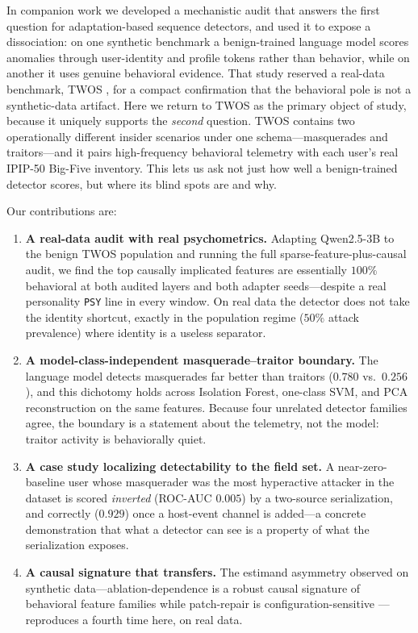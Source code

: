 \documentclass[10pt]{article}
\begin{document}
In companion work we developed a mechanistic audit that answers the first
question for adaptation-based sequence detectors, and used it to expose a
dissociation: on one synthetic benchmark a benign-trained language model scores
anomalies through user-identity and profile tokens rather than behavior, while
on another it uses genuine behavioral evidence. That study reserved a real-data
benchmark, TWOS \citep{harilal2017twos}, for a compact confirmation that the
behavioral pole is not a synthetic-data artifact. Here we return to TWOS as the
primary object of study, because it uniquely supports the \emph{second}
question. TWOS contains two operationally different insider scenarios under one
schema---masquerades and traitors---and it pairs high-frequency behavioral
telemetry with each user's real IPIP-50 Big-Five inventory. This lets us ask
not just how well a benign-trained detector scores, but where its blind spots
are and why.

Our contributions are:
\begin{enumerate}[leftmargin=1.3em]
\item \textbf{A real-data audit with real psychometrics.} Adapting Qwen2.5-3B
to the benign TWOS population and running the full sparse-feature-plus-causal
audit, we find the top causally implicated features are essentially $100\%$
behavioral at both audited layers and both adapter seeds---despite a real
personality \texttt{PSY} line in every window. On real data the detector does
not take the identity shortcut, exactly in the population regime
($50\%$ attack prevalence) where identity is a useless separator.
\item \textbf{A model-class-independent masquerade--traitor boundary.} The
language model detects masquerades far better than traitors
($0.780$ vs.\ $0.256$), and this dichotomy holds across Isolation Forest,
one-class SVM, and PCA reconstruction on the same features. Because four
unrelated detector families agree, the boundary is a statement about the
telemetry, not the model: traitor activity is behaviorally quiet.
\item \textbf{A case study localizing detectability to the field set.} A
near-zero-baseline user whose masquerader was the most hyperactive attacker in
the dataset is scored \emph{inverted} (ROC-AUC $0.005$) by a two-source
serialization, and correctly ($0.929$) once a host-event channel is added---a
concrete demonstration that what a detector can see is a property of what the
serialization exposes.
\item \textbf{A causal signature that transfers.} The estimand asymmetry
observed on synthetic data---ablation-dependence is a robust causal signature
of behavioral feature families while patch-repair is configuration-sensitive
---reproduces a fourth time here, on real data.
\end{enumerate}
\end{document}
